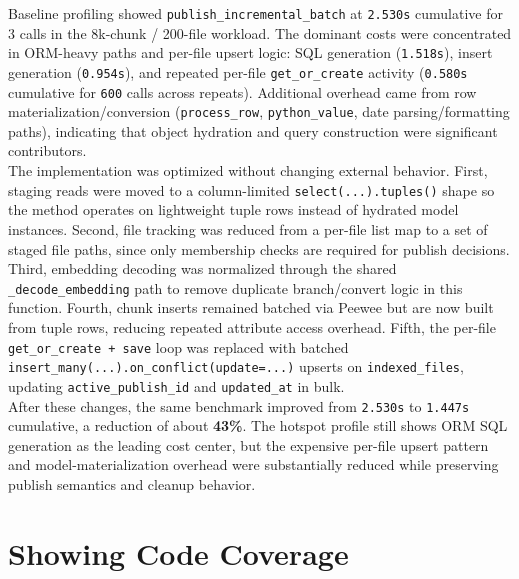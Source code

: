 \documentclass[a4paper,12pt]{article}
\begin{document}
Baseline profiling showed \texttt{publish\_incremental\_batch} at \texttt{2.530s} cumulative for 3 calls in the 8k-chunk / 200-file workload. The dominant costs were concentrated in ORM-heavy paths and per-file upsert logic: SQL generation (\texttt{1.518s}), insert generation (\texttt{0.954s}), and repeated per-file \texttt{get\_or\_create} activity (\texttt{0.580s} cumulative for \texttt{600} calls across repeats). Additional overhead came from row materialization/conversion (\texttt{process\_row}, \texttt{python\_value}, date parsing/formatting paths), indicating that object hydration and query construction were significant contributors. \\

The implementation was optimized without changing external behavior. First, staging reads were moved to a column-limited \texttt{select(...).tuples()} shape so the method operates on lightweight tuple rows instead of hydrated model instances. Second, file tracking was reduced from a per-file list map to a set of staged file paths, since only membership checks are required for publish decisions. Third, embedding decoding was normalized through the shared \texttt{\_decode\_embedding} path to remove duplicate branch/convert logic in this function. Fourth, chunk inserts remained batched via Peewee but are now built from tuple rows, reducing repeated attribute access overhead. Fifth, the per-file \texttt{get\_or\_create + save} loop was replaced with batched \texttt{insert\_many(...).on\_conflict(update=...)} upserts on \texttt{indexed\_files}, updating \texttt{active\_publish\_id} and \texttt{updated\_at} in bulk. \\

After these changes, the same benchmark improved from \texttt{2.530s} to \texttt{1.447s} cumulative, a reduction of about \textbf{43\%}. The hotspot profile still shows ORM SQL generation as the leading cost center, but the expensive per-file upsert pattern and model-materialization overhead were substantially reduced while preserving publish semantics and cleanup behavior.


\newpage
\section{Showing Code Coverage}
\end{document}
